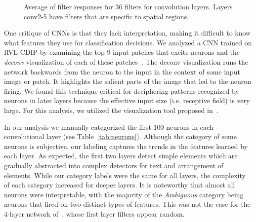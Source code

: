 \documentclass[10pt, conference, compsocconf]{IEEEtran}
\newcommand{\squeezeup}{\vspace{-2.5mm}}
\begin{document}
\begin{figure}

\centering
{} \hspace{5pt}
 \hspace{5pt}

 \hspace{5pt}

\caption{Average of filter responses for 36 filters for convolution layers.  Layers conv2-5 have filters that are specific to spatial regions.}
\label{fig:spatial}
\squeezeup
\end{figure}



One critique of CNNs is that they lack interpretation, making it difficult to know what features they use for classification decisions.
We analyzed a CNN trained on RVL-CDIP by examining the top-9 input patches that excite neurons and the \emph{deconv} visualization of each of these patches~\cite{zeiler14}.
The deconv visualization runs the network backwards from the neuron to the input in the context of some input image or patch.
It highlights the salient parts of the image that led to the neuron firing.
We found this technique critical for deciphering patterns recognized by neurons in later layers because the effective input size (i.e. receptive field) is very large.
For this analysis, we utilized the visualization tool proposed in~\cite{yosinski15}.

In our analysis we manually categorized the first 100 neurons in each convolutional layer (see Table~\ref{tab:neurons}).
Although the category of some neurons is subjective,
our labeling captures the trends in the features learned by each layer.
As expected, the first two layers detect simple elements which are gradually abstracted into complex detectors for text and arrangement of elements.
While our category labels were the same for all layers, the complexity of each category increased for deeper layers.
It is noteworthy that almost all neurons were interpretable, with the majority of the \emph{Ambiguous} category being neurons that fired on two distinct types of features.
This was not the case for the 4-layer network of~\cite{kang14}, whose first layer filters appear random.
\end{document}
